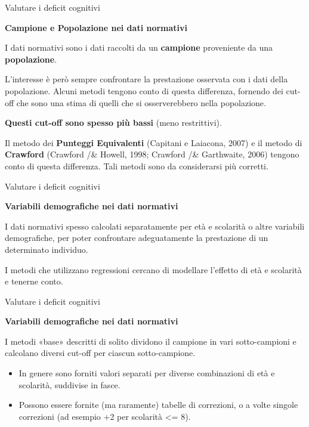 \documentclass[
  ignorenonframetext,
]{beamer}
\begin{document}
\begin{frame}{Valutare i deficit cognitivi}
\label{valutare-i-deficit-cognitivi-43}
\begin{center}
  \textbf{Campione e Popolazione nei dati normativi}
\end{center}
\vspace{1em}

I dati normativi sono i dati raccolti da un \textbf{campione}
proveniente da una \textbf{popolazione}.

L'interesse è però sempre confrontare la prestazione osservata con i
dati della popolazione. Alcuni metodi tengono conto di questa
differenza, fornendo dei cut-off che sono una stima di quelli che si
osserverebbero nella popolazione.

\textbf{Questi cut-off sono spesso più bassi} (meno restrittivi).

Il metodo dei \textbf{Punteggi Equivalenti} (Capitani e Laiacona, 2007)
e il metodo di \textbf{Crawford} (Crawford /\& Howell, 1998; Crawford
/\& Garthwaite, 2006) tengono conto di questa differenza. Tali metodi
sono da considerarsi più corretti.
\end{frame}

\begin{frame}{Valutare i deficit cognitivi}
\label{valutare-i-deficit-cognitivi-44}
\begin{center}
  \textbf{Variabili demografiche nei dati normativi}
\end{center}
\vspace{2em}

I dati normativi spesso calcolati separatamente per età e scolarità o
altre variabili demografiche, per poter confrontare adeguatamente la
prestazione di un determinato individuo.

I metodi che utilizzano regressioni cercano di modellare l'effetto di
età e scolarità e tenerne conto.
\end{frame}

\begin{frame}{Valutare i deficit cognitivi}
\label{valutare-i-deficit-cognitivi-45}
\begin{center}
  \textbf{Variabili demografiche nei dati normativi}
\end{center}
\vspace{2em}

I metodi «base» descritti di solito dividono il campione in vari
sotto-campioni e calcolano diversi cut-off per ciascun sotto-campione.

\begin{itemize}
\item
  In genere sono forniti valori separati per diverse combinazioni di età
  e scolarità, suddivise in fasce.
\item
  Possono essere fornite (ma raramente) tabelle di correzioni, o a volte
  singole correzioni (ad esempio +2 per scolarità \textless= 8).
\end{itemize}
\end{frame}
\end{document}
